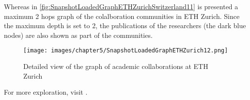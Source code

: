Whereas in \hyperref[fig:SnapshotLoadedGraphETHZurichSwitzerland11]{\autoref{fig:SnapshotLoadedGraphETHZurichSwitzerland11}} is presented a maximum 2 hops graph of the colalboration communities in ETH Zurich.
Since the maximum depth is set to 2, the publications of the researchers (the dark blue nodes) are also shown as part of the communities. 

\begin{figure}[H]%
	\centering%
	\texttt{[image: images/chapter5/SnapshotLoadedGraphETHZurich12.png]}%
	\caption[Detailed view of the graph of academic collaborations at ETH Zurich]{Detailed view of the graph of academic collaborations at ETH Zurich}%
	\label{fig:SnapshotLoadedGraphETHZurich12}%
\end{figure}%

For more exploration, visit .

\newpage
\thispagestyle{empty}
